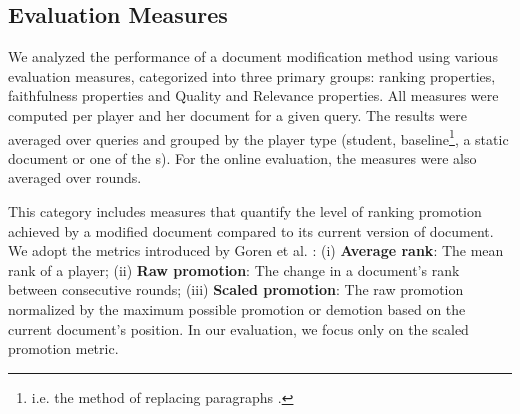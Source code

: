 \subsection{Evaluation Measures}
\label{sec:eval-measures}
We analyzed the performance of a document modification method using various evaluation measures, categorized into three primary groups: ranking properties, faithfulness properties and Quality and Relevance properties. All measures were computed per player and her document for a given query. The results were averaged over queries and grouped by the player type (student, baseline\footnote{i.e. the method of replacing paragraphs \cite{goren2020ranking}.}, a static document or one of the \bt s). For the online evaluation, the measures were also averaged over rounds.

 This category includes measures that quantify the level of ranking promotion achieved by a modified document compared to its current version of document. We adopt the metrics introduced by Goren et al. \cite{goren2020ranking}: (i) \textbf{Average rank}: The mean rank of a player; (ii) \textbf{Raw promotion}: The change in a document's rank between consecutive rounds; (iii) \textbf{Scaled promotion}: The raw promotion normalized by the maximum possible promotion or demotion based on the current document's position. In our evaluation, we focus only on the scaled promotion metric.


